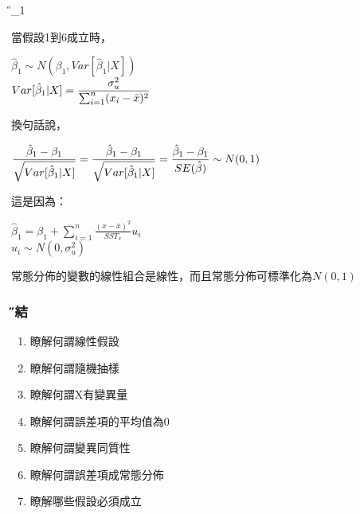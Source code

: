 \documentclass[xcolor=dvipsnames]{beamer}
\begin{document}
\begin{frame}{\H \hat{\beta}_{1}}
\begin{theorem}[抽樣分佈]
當假設1到6成立時，
\begin{center}
$\hat{\beta}_{1}\sim N(\beta_{1},Var[\hat{\beta}_{1}|X])$\\
$\mathlarger{Var[\hat{\beta}_{1}|X]=\frac{\sigma_{u}^{2}}{\sum_{i=1}^{n}(x_{i}-\bar{x})^2} } $
\end{center}
換句話說，
\begin{center}
$\mathlarger{\frac{\hat{\beta}_{1}-\beta_{1}}{\sqrt{Var[\hat{\beta}_{1}|X]}}=\frac{\hat{\beta}_{1}-\beta_{1}}{\sqrt{Var[\hat{\beta}_{1}|X]}}=\frac{\hat{\beta}_{1}-\beta_{1}}{SE(\hat{\beta})}\sim N(0,1)}$
\end{center}
\end{theorem}
這是因為：
\begin{center}
$ \hat{\beta}_{1} = \beta_{1}+\sum\limits_{i=1}^{n}\frac{(x-\bar{x})^2}{SST_{x}} u_{i}$\\
$u_{i}\sim N(0,\sigma_{u}^{2})$
\end{center}
常態分佈的變數的線性組合是線性，而且常態分佈可標準化為$ N(0,1) $
\end{frame}

\begin{frame}\frametitle{\H 總結}
\begin{enumerate}
\item {\K 瞭解何謂線性假設}
\item {\K 瞭解何謂隨機抽樣}
\item {\K 瞭解何謂X有變異量}
\item {\K 瞭解何謂誤差項的平均值為0}
\item {\K 瞭解何謂變異同質性}
\item {\K 瞭解何謂誤差項成常態分佈}
\item {\K 瞭解哪些假設必須成立}
\end{enumerate}
\end{frame}
\end{document}
